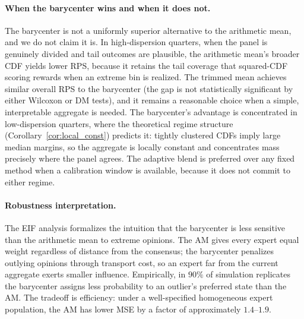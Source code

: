 \paragraph{When the barycenter wins and when it does not.}  The barycenter is not a uniformly superior alternative to the arithmetic mean, and we do not claim it is.  In high-dispersion quarters, when the panel is genuinely divided and tail outcomes are plausible, the arithmetic mean's broader CDF yields lower RPS, because it retains the tail coverage that squared-CDF scoring rewards when an extreme bin is realized.  The trimmed mean achieves similar overall RPS to the barycenter (the gap is not statistically significant by either Wilcoxon or DM tests), and it remains a reasonable choice when a simple, interpretable aggregate is needed.  The barycenter's advantage is concentrated in low-dispersion quarters, where the theoretical regime structure (Corollary~\ref{cor:local_const}) predicts it: tightly clustered CDFs imply large median margins, so the aggregate is locally constant and concentrates mass precisely where the panel agrees.  The adaptive blend is preferred over any fixed method when a calibration window is available, because it does not commit to either regime.

\paragraph{Robustness interpretation.}  The EIF analysis formalizes the intuition that the barycenter is less sensitive than the arithmetic mean to extreme opinions.  The AM gives every expert equal weight regardless of distance from the consensus; the barycenter penalizes outlying opinions through transport cost, so an expert far from the current aggregate exerts smaller influence.  Empirically, in $90\%$ of simulation replicates the barycenter assigns less probability to an outlier's preferred state than the AM.  The tradeoff is efficiency: under a well-specified homogeneous expert population, the AM has lower MSE by a factor of approximately $1.4$--$1.9$.

